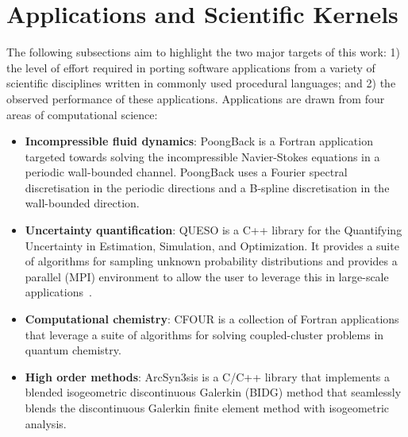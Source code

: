 \section{Applications and Scientific Kernels}
\label{sec:apps}

The following subsections aim to highlight the two major targets of this work: 1) the level of effort
required in porting software applications from a variety of scientific
disciplines written in commonly used procedural languages; and 2) the observed
performance of these applications.  Applications are drawn from four areas
of computational science:
\begin{itemize}
\item {\bf Incompressible fluid dynamics}:  PoongBack is a Fortran application
targeted towards solving the incompressible Navier-Stokes equations in a
periodic wall-bounded channel.  PoongBack uses a Fourier spectral
discretisation in the periodic directions and a B-spline discretisation in the
wall-bounded direction.

\item {\bf Uncertainty quantification}:  QUESO is a C++ library for the
Quantifying Uncertainty in Estimation, Simulation, and Optimization.  It
provides a suite of algorithms for sampling unknown probability distributions
and provides a parallel (MPI) environment to allow the user to leverage this in
large-scale applications~\cite{Prudencio:2012ft,McDougall:2015bc,EstacioHiroms:2016wd}.

\item {\bf Computational chemistry}:  CFOUR is a collection of Fortran
applications that leverage a suite of algorithms for solving coupled-cluster
problems in quantum chemistry.

\item {\bf High order methods}:  ArcSyn3sis is a C/C++ library that implements
a blended isogeometric discontinuous Galerkin (BIDG) method that seamlessly
blends the discontinuous Galerkin finite element method with isogeometric analysis.

\end{itemize}

%
